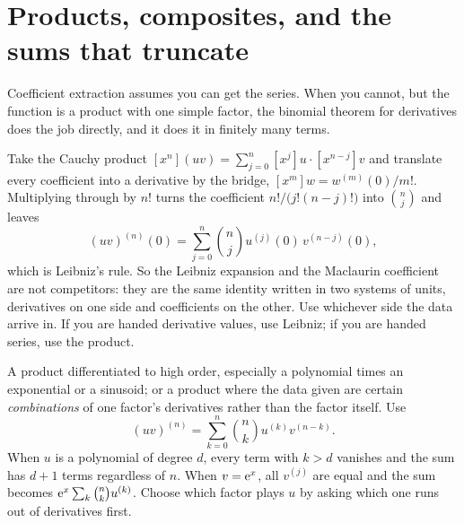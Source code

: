 \section{Products, composites, and the sums that truncate}

Coefficient extraction assumes you can get the series. When you cannot, but the function is a product with one simple factor, the binomial theorem for derivatives does the job directly, and it does it in finitely many terms.

\begin{keynote}
Take the Cauchy product $[x^{n}](uv)=\sum_{j=0}^{n}[x^{j}]u\cdot[x^{n-j}]v$ and translate every coefficient into a derivative by the bridge, $[x^{m}]w=w^{(m)}(0)/m!$. Multiplying through by $n!$ turns the coefficient $n!/\bigl(j!(n-j)!\bigr)$ into $\binom nj$ and leaves
\[
(uv)^{(n)}(0)=\sum_{j=0}^{n}\binom nj u^{(j)}(0)\,v^{(n-j)}(0),
\]
which is Leibniz's rule. So the Leibniz expansion and the Maclaurin coefficient are not competitors: they are the same identity written in two systems of units, derivatives on one side and coefficients on the other. Use whichever side the data arrive in. If you are handed derivative values, use Leibniz; if you are handed series, use the product.
\end{keynote}

\cue A product differentiated to high order, especially a polynomial times an exponential or a sinusoid; or a product where the data given are certain \emph{combinations} of one factor's derivatives rather than the factor itself.
\method Use
\[
(uv)^{(n)}=\sum_{k=0}^{n}\binom nk u^{(k)}v^{(n-k)} .
\]
When $u$ is a polynomial of degree $d$, every term with $k>d$ vanishes and the sum has $d+1$ terms regardless of $n$. When $v=\mathrm{e}^{x}$, all $v^{(j)}$ are equal and the sum becomes $\mathrm{e}^{x}\sum_{k}\binom nk u^{(k)}$. Choose which factor plays $u$ by asking which one runs out of derivatives first.

